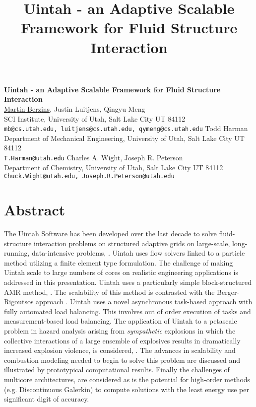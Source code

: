 \title{Uintah - an Adaptive Scalable Framework for Fluid Structure Interaction}
\author{} \institute{}

\begin{center}

\textbf{\Large Uintah - an Adaptive Scalable Framework for Fluid Structure Interaction}\\
\vspace{10mm}
{\underline{Martin Berzins}, Justin Luitjens, Qingyu Meng}\\
SCI Institute, University of Utah, Salt Lake City UT 84112\\
{\tt mb@cs.utah.edu, luitjens@cs.utah.edu,  qymeng@cs.utah.edu}
\vspace{4mm}
{\large Todd Harman}\\
Department of Mechanical Engineering, University of Utah, Salt Lake City UT 84112\\
\vspace{4mm}
{\tt T.Harman@utah.edu}
{\large Charles A. Wight, Joseph R. Peterson}\\
Department of Chemistry, University of Utah, Salt Lake City UT 84112\\
{\tt Chuck.Wight@utah.edu, Joseph.R.Peterson@utah.edu}

\end{center}

\section*{Abstract}

The Uintah Software has been developed over the last decade \cite{csafe2,csafe3} to solve fluid-structure interaction problems on structured adaptive grids on large-scale, long-running, data-intensive problems, \cite{fourthmit}. Uintah uses flow solvers linked to a particle method utlizing a finite element type formulation. The challenge of making Uintah scale to large numbers of cores on realistic engineering applications is addressed in this presentation. Uintah uses a particularly simple block-structured AMR method, \cite{IPDPS10}. The scalability of this method is contrasted with the Berger-Rigoutsos approach \cite{BergerRigoutsos}. Uintah uses a novel asynchronous task-based approach with fully automated load balancing. This involves out of order execution of tasks \cite{Meng}  and measurement-based load balancing. The application of Uintah to a petascale problem in hazard analysis arising from {\it sympathetic} explosions in which the collective interactions of a large ensemble of explosives results in dramatically increased explosion violence, is considered, \cite{Ber2010b}. The advances in scalability and combustion modeling needed to begin to solve this problem are discussed and illustrated by prototypical computational results. Finally the challenges of multicore architectures, are considered as is the potential for high-order methods (e.g. Discontinuous Galerkin) to compute solutions with the least energy use per significant digit of accuracy.

